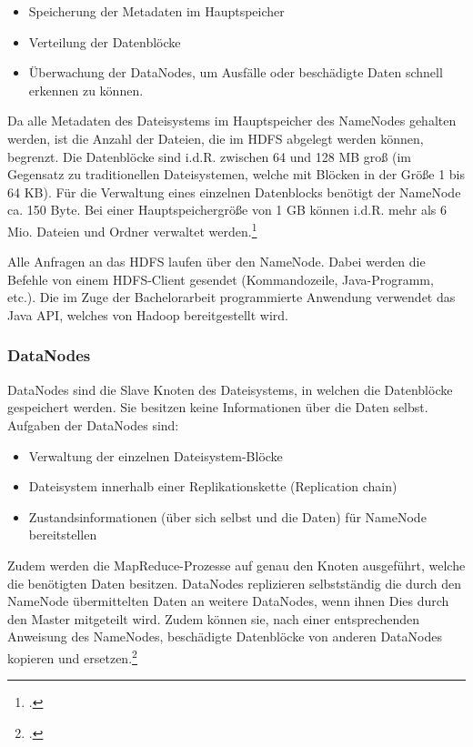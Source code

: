 \begin{itemize}
	\item Speicherung der Metadaten im Hauptspeicher
	\item Verteilung der Datenblöcke
	\item Überwachung der DataNodes, um Ausfälle oder beschädigte Daten schnell erkennen zu können.
\end{itemize}

Da alle Metadaten des Dateisystems im Hauptspeicher des NameNodes gehalten werden, ist die Anzahl der Dateien, die im \ac{HDFS} abgelegt werden können, begrenzt. Die Datenblöcke sind i.d.R. zwischen 64 und 128 \ac{MB} groß (im Gegensatz zu traditionellen Dateisystemen, welche mit Blöcken in der Größe 1 bis 64 \ac{KB}). Für die Verwaltung eines einzelnen Datenblocks benötigt der NameNode ca. 150 Byte. Bei einer Hauptspeichergröße von 1 \ac{GB} können i.d.R. mehr als 6 Mio. Dateien und Ordner verwaltet werden.\footcite[Vgl.][S. 24]{Wartala.2012}

Alle Anfragen an das \ac{HDFS} laufen über den NameNode. Dabei werden die Befehle von einem \ac{HDFS}-Client gesendet (Kommandozeile, Java-Programm, etc.). Die im Zuge der Bachelorarbeit programmierte Anwendung verwendet das Java \ac{API}, welches von Hadoop bereitgestellt wird.

\subsubsection{DataNodes}
DataNodes sind die Slave Knoten des Dateisystems, in welchen die Datenblöcke gespeichert werden. Sie besitzen keine Informationen über die Daten selbst. Aufgaben der DataNodes sind:

\begin{itemize}
	\item Verwaltung der einzelnen Dateisystem-Blöcke
	\item Dateisystem innerhalb einer Replikationskette (Replication chain)
	\item Zustandsinformationen (über sich selbst und die Daten) für NameNode bereitstellen
\end{itemize}

Zudem werden die MapReduce-Prozesse auf genau den Knoten ausgeführt, welche die benötigten Daten besitzen. DataNodes replizieren selbstständig die durch den NameNode übermittelten Daten an weitere DataNodes, wenn ihnen Dies durch den Master mitgeteilt wird. Zudem können sie, nach einer entsprechenden Anweisung des NameNodes, beschädigte Datenblöcke von anderen DataNodes kopieren und ersetzen.\footcite[Vgl.][S. 25 f.]{Wartala.2012}


